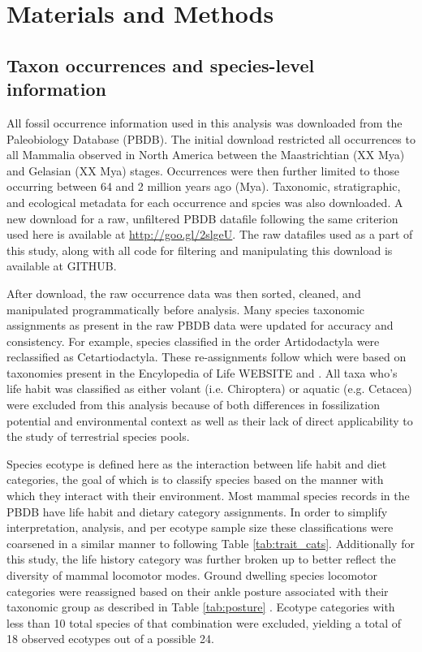 \documentclass[12pt,letterpaper]{article}
\begin{document}
\section*{Materials and Methods}

\subsection*{Taxon occurrences and species-level information}
All fossil occurrence information used in this analysis was downloaded from the Paleobiology Database (PBDB). The initial download restricted all occurrences to all Mammalia observed in North America between the Maastrichtian (XX Mya) and Gelasian (XX Mya) stages. Occurrences were then further limited to those occurring between 64 and 2 million years ago (Mya). Taxonomic, stratigraphic, and ecological metadata for each occurrence and spcies was also downloaded. A new download for a raw, unfiltered PBDB datafile following the same criterion used here is available at \url{http://goo.gl/2slgeU}. The raw datafiles used as a part of this study, along with all code for filtering and manipulating this download is available at GITHUB.

After download, the raw occurrence data was then sorted, cleaned, and manipulated programmatically before analysis. Many species taxonomic assignments as present in the raw PBDB data were updated for accuracy and consistency. For example, species classified in the order Artidodactyla were reclassified as Cetartiodactyla. These re-assignments follow \citet{Smits2015b} which were based on taxonomies present in the Encylopedia of Life WEBSITE and \citet{Janis1998,Janis2008}. All taxa who's life habit was classified as either volant (i.e. Chiroptera) or aquatic (e.g. Cetacea) were excluded from this analysis because of both differences in fossilization potential and environmental context as well as their lack of direct applicability to the study of terrestrial species pools.

Species ecotype is defined here as the interaction between life habit and diet categories, the goal of which is to classify species based on the manner with which they interact with their environment. Most mammal species records in the PBDB have life habit and dietary category assignments. In order to simplify interpretation, analysis, and per ecotype sample size these classifications were coarsened in a similar manner to \citep{Smits2015b} following Table \ref{tab:trait_cats}. Additionally for this study, the life history category was further broken up to better reflect the diversity of mammal locomotor modes. Ground dwelling species locomotor categories were reassigned based on their ankle posture associated with their taxonomic group as described in Table \ref{tab:posture} \citep{Carrano1999}. Ecotype categories with less than 10 total species of that combination were excluded, yielding a total of 18 observed ecotypes out of a possible 24.
\end{document}
